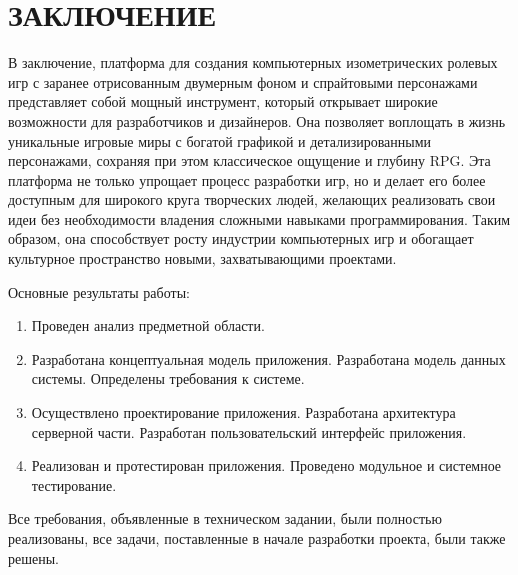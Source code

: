 \section*{ЗАКЛЮЧЕНИЕ}

В заключение, платформа для создания компьютерных изометрических ролевых игр с заранее отрисованным двумерным фоном и спрайтовыми персонажами представляет собой мощный инструмент, который открывает широкие возможности для разработчиков и дизайнеров. Она позволяет воплощать в жизнь уникальные игровые миры с богатой графикой и детализированными персонажами, сохраняя при этом классическое ощущение и глубину RPG. Эта платформа не только упрощает процесс разработки игр, но и делает его более доступным для широкого круга творческих людей, желающих реализовать свои идеи без необходимости владения сложными навыками программирования. Таким образом, она способствует росту индустрии компьютерных игр и обогащает культурное пространство новыми, захватывающими проектами.

Основные результаты работы:

\begin{enumerate}
\item Проведен анализ предметной области.
\item Разработана концептуальная модель приложения. Разработана модель данных системы. Определены требования к системе.
\item Осуществлено проектирование приложения. Разработана архитектура серверной части. Разработан пользовательский интерфейс приложения.
\item Реализован и протестирован приложения. Проведено модульное и системное тестирование.
\end{enumerate}

Все требования, объявленные в техническом задании, были полностью реализованы, все задачи, поставленные в начале разработки проекта, были также решены. 
